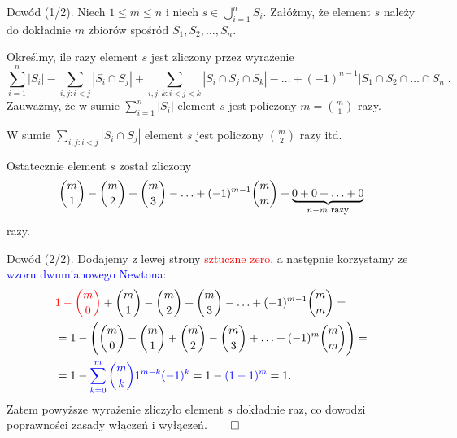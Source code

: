 \documentclass[a4paper,10pt]{beamer}
\begin{document}
\begin{frame}
	\begin{block}{Dowód (1/2).}
		Niech $1\leqslant m\leqslant n$ i niech $\displaystyle s\in\bigcup\limits_{i=1}^nS_i$. Załóżmy, że element $s$ należy do dokładnie $m$ zbiorów spośród $S_1,S_2,\ldots,S_n$. 
		
		Określmy, ile razy element $s$ jest zliczony przez wyrażenie
		$$\sum\limits_{i=1}^n|S_i|-\sum_{i,j:i<j}|S_i\cap S_j|+\sum_{i,j,k:i<j<k}|S_i\cap S_j\cap S_k|-\ldots+(-1)^{n-1}|S_1\cap S_2\cap\ldots\cap S_n|.$$
		Zauważmy, że w sumie $\displaystyle\sum\limits_{i=1}^n|S_i|$ element $s$ jest policzony $m={m\choose1}$ razy.
		
		W sumie $\displaystyle \sum_{i,j:i<j}|S_i\cap S_j|$ element $s$ jest policzony ${m\choose2}$ razy itd.
		
		Ostatecznie element $s$ został zliczony
		$${m\choose1}-{m\choose2}+{m\choose3}-\ldots+(-1)^{m-1}{m\choose m}+\underbrace{0+0+\ldots+0}_{n-m\mbox{\footnotesize{ razy}}}$$ razy.
	\end{block}
\end{frame}

\begin{frame}
	\begin{block}{Dowód (2/2).}
Dodajemy z lewej strony \textcolor{red}{sztuczne zero}, a następnie korzystamy ze \textcolor{blue}{wzoru dwumianowego Newtona}: 
		\begin{align*}&\textcolor{red}{1-{m\choose0}}+{m\choose1}-{m\choose2}+{m\choose3}-\ldots+(-1)^{m-1}{m\choose m}=\\
		&=1-\Bigg({m\choose0}-{m\choose1}+{m\choose2}-{m\choose3}+\ldots+(-1)^m{m\choose m}\Bigg)=\\
		&=1-\textcolor{blue}{\sum\limits_{k=0}^m{m\choose k}1^{m-k}(-1)^k}=1-\textcolor{blue}{(1-1)^m}=1.
		\end{align*}
Zatem powyższe wyrażenie zliczyło element $s$ dokładnie raz, co dowodzi poprawności zasady włączeń i wyłączeń.\hfill$\qed$
	\end{block}
\end{frame}
\end{document}
